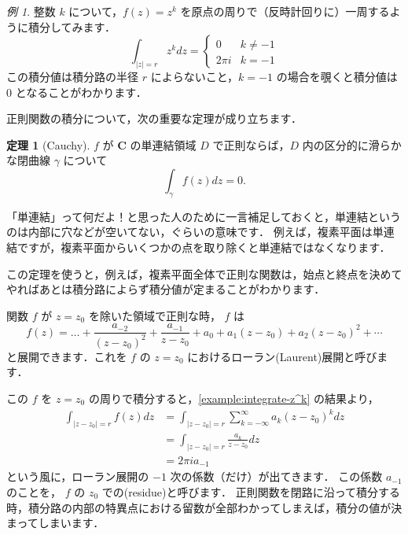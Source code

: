 \documentclass{ltjsarticle}
\newcommand{\Complex}{\mathbf{C}}
\newcommand{\abs}[1]{\left\lvert #1\right\rvert}
\theoremstyle{definition}
\newtheorem{theorem}{定理}
\theoremstyle{remark}
\newtheorem{example}{例}
\begin{document}
\begin{example} \label{example:integrate-z^k}
  整数 $k$ について，$f(z)=z^k$ を原点の周りで（反時計回りに）一周するように積分してみます．
  \[
  \int_{\abs{z}=r} z^k dz=\begin{cases}
  0 & k\ne -1 \\
  2\pi i & k=-1
  \end{cases}
  \]
  この積分値は積分路の半径 $r$ によらないこと，$k=-1$ の場合を覗くと積分値は $0$ となることがわかります．
\end{example}

正則関数の積分について，次の重要な定理が成り立ちます．

\begin{theorem}[Cauchy]
  $f$ が $\Complex$ の単連結領域 $D$ で正則ならば，$D$ 内の区分的に滑らかな閉曲線 $\gamma$ について
  \[\int_\gamma f(z)dz=0.\]
\end{theorem}

「単連結」って何だよ！と思った人のために一言補足しておくと，単連結というのは内部に穴などが空いてない，ぐらいの意味です．
例えば，複素平面は単連結ですが，複素平面からいくつかの点を取り除くと単連結ではなくなります．

この定理を使うと，例えば，複素平面全体で正則な関数は，始点と終点を決めてやればあとは積分路によらず積分値が定まることがわかります．

関数 $f$ が $z=z_0$ を除いた領域で正則な時， $f$ は
\[f(z)=\dots+\frac{a_{-2}}{(z-z_0)^2}+\frac{a_{-1}}{z-z_0}+a_0+a_1(z-z_0)+a_2(z-z_0)^2+\dotsb\]
と展開できます．これを $f$ の $z=z_0$ におけるローラン(Laurent)展開と呼びます．

この $f$ を $z=z_0$ の周りで積分すると，\autoref{example:integrate-z^k} の結果より，
\begin{align*}
\int_{\abs{z-z_0}=r} f(z)dz
&=\int_{\abs{z-z_0}=r} \sum_{k=-\infty}^\infty a_k (z-z_0)^k dz \\
&=\int_{\abs{z-z_0}=r} \frac{a_k}{z-z_0} dz \\
&=2\pi i a_{-1}
\end{align*}
という風に，ローラン展開の $-1$ 次の係数（だけ）が出てきます．
この係数 $a_{-1}$ のことを， $f$ の $z_0$ での(residue)と呼びます．
正則関数を閉路に沿って積分する時，積分路の内部の特異点における留数が全部わかってしまえば，積分の値が決まってしまいます．
\end{document}
